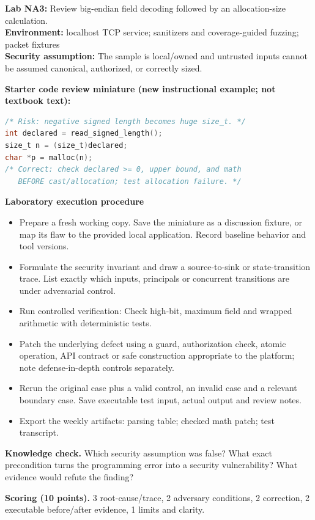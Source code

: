 \documentclass[10pt,letterpaper]{article}
\begin{document}
\begin{insight}\textbf{Lab NA3:} Review big-endian field decoding followed by an allocation-size calculation.\\\textbf{Environment:} localhost TCP service; sanitizers and coverage-guided fuzzing; packet fixtures\\\textbf{Security assumption:} The sample is local/owned and untrusted inputs cannot be assumed canonical, authorized, or correctly sized.\end{insight}
\textbf{Starter code review miniature (new instructional example; not textbook text):}
\begin{lstlisting}[language=C]
/* Risk: negative signed length becomes huge size_t. */
int declared = read_signed_length();
size_t n = (size_t)declared;
char *p = malloc(n);
/* Correct: check declared >= 0, upper bound, and math
   BEFORE cast/allocation; test allocation failure. */
\end{lstlisting}
\textbf{Laboratory execution procedure}
\begin{itemize}[leftmargin=*,itemsep=2pt]
\item Prepare a fresh working copy. Save the miniature as a discussion fixture, or map its flaw to the provided local application. Record baseline behavior and tool versions.
\item Formulate the security invariant and draw a source-to-sink or state-transition trace. List exactly which inputs, principals or concurrent transitions are under adversarial control.
\item Run controlled verification: Check high-bit, maximum field and wrapped arithmetic with deterministic tests.
\item Patch the underlying defect using a guard, authorization check, atomic operation, API contract or safe construction appropriate to the platform; note defense-in-depth controls separately.
\item Rerun the original case plus a valid control, an invalid case and a relevant boundary case. Save executable test input, actual output and review notes.
\item Export the weekly artifacts: parsing table; checked math patch; test transcript.
\end{itemize}
\textbf{Knowledge check.} Which security assumption was false? What exact precondition turns the programming error into a security vulnerability? What evidence would refute the finding?

\textbf{Scoring (10 points).} 3 root-cause/trace, 2 adversary conditions, 2 correction, 2 executable before/after evidence, 1 limits and clarity.
\end{document}
